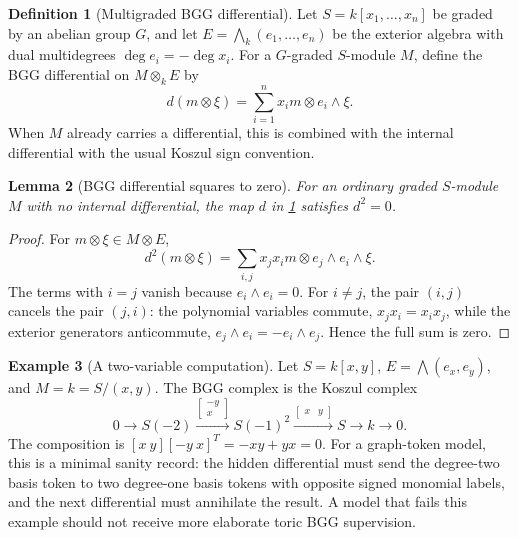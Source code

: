 \documentclass[11pt]{article}
\theoremstyle{definition}
\newtheorem{definition}{Definition}[section]
\newtheorem{example}[definition]{Example}
\theoremstyle{plain}
\newtheorem{lemma}[definition]{Lemma}
\theoremstyle{remark}
\numberwithin{equation}{section}
\begin{document}
\begin{definition}[Multigraded BGG differential]\label{def:multigraded-bgg-diff}
Let $S=k[x_1,\ldots,x_n]$ be graded by an abelian group $G$, and let $E=\bigwedge_k(e_1,\ldots,e_n)$ be the exterior algebra with dual multidegrees $\deg e_i=-\deg x_i$.  For a $G$-graded $S$-module $M$, define the BGG differential on $M\otimes_k E$ by
\begin{equation}
  d(m\otimes \xi)=\sum_{i=1}^n x_i m\otimes e_i\wedge \xi.
\end{equation}
When $M$ already carries a differential, this is combined with the internal differential with the usual Koszul sign convention.
\end{definition}

\begin{lemma}[BGG differential squares to zero]\label{lem:bgg-d2}
For an ordinary graded $S$-module $M$ with no internal differential, the map $d$ in \cref{def:multigraded-bgg-diff} satisfies $d^2=0$.
\end{lemma}

\begin{proof}
For $m\otimes\xi\in M\otimes E$,
\begin{equation}
  d^2(m\otimes\xi)=\sum_{i,j}x_jx_i m\otimes e_j\wedge e_i\wedge \xi.
\end{equation}
The terms with $i=j$ vanish because $e_i\wedge e_i=0$.  For $i\ne j$, the pair $(i,j)$ cancels the pair $(j,i)$: the polynomial variables commute, $x_jx_i=x_ix_j$, while the exterior generators anticommute, $e_j\wedge e_i=-e_i\wedge e_j$.  Hence the full sum is zero.
\end{proof}

\begin{example}[A two-variable computation]\label{ex:bgg-two-var}
Let $S=k[x,y]$, $E=\bigwedge(e_x,e_y)$, and $M=k=S/(x,y)$.  The BGG complex is the Koszul complex
\begin{equation}
  0\longrightarrow S(-2)\xrightarrow{\begin{bmatrix}-y\\x\end{bmatrix}}S(-1)^2\xrightarrow{\begin{bmatrix}x&y\end{bmatrix}}S\longrightarrow k\longrightarrow0.
\end{equation}
The composition is $[x\ y][-y\ x]^T=-xy+yx=0$.  For a graph-token model, this is a minimal sanity record: the hidden differential must send the degree-two basis token to two degree-one basis tokens with opposite signed monomial labels, and the next differential must annihilate the result.  A model that fails this example should not receive more elaborate toric BGG supervision.
\end{example}
\end{document}
